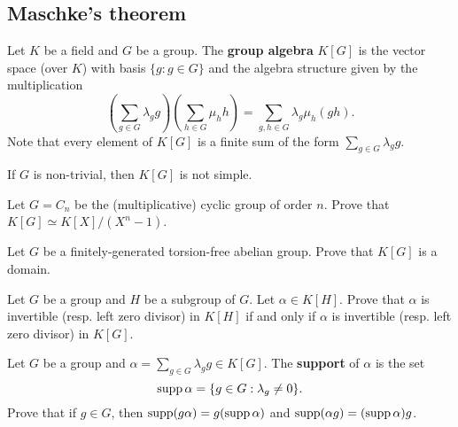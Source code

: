 \chapter{}

\section*{Maschke's theorem}

Let $K$ be a field and $G$ be a group. The \textbf{group algebra} $K[G]$ 
is the vector space (over $K$) with basis $\{g:g\in G\}$ 
and the algebra structure given by the multiplication
\[
	\left(\sum_{g\in G}\lambda_gg\right)\left(\sum_{h\in G}\mu_hh\right)
	=\sum_{g,h\in G}\lambda_g\mu_h(gh).
\]
Note that every element of $K[G]$ is a finite sum of the form $\sum_{g\in G}\lambda_gg$.

\begin{exercise}
\label{xc:K[G]notsimple}
    If $G$ is non-trivial, then $K[G]$ is not simple. 
\end{exercise}

\begin{exercise}
	Let $G=C_n$ be the (multiplicative) cyclic group of order $n$. Prove that 
	$K[G]\simeq K[X]/(X^n-1)$. 
\end{exercise}

\begin{exercise}
	Let $G$ be a finitely-generated torsion-free abelian group. Prove that 
	$K[G]$ is a domain. 
\end{exercise}

\begin{exercise}
	Let $G$ be a group and $H$ be a subgroup of $G$. Let $\alpha\in K[H]$. Prove that 
    $\alpha$ is invertible (resp. left zero divisor) in $K[H]$ if and only if 
	$\alpha$ is invertible (resp. left zero divisor) in
	$K[G]$.
\end{exercise}

\begin{exercise}
	Let $G$ be a group and $\alpha=\sum_{g\in G}\lambda_gg\in K[G]$.  
	The \textbf{support} of $\alpha$ is the set 
	\[
		\operatorname{supp}\alpha=\{g\in G:\lambda_g\ne 0\}.
	\]
	Prove that if $g\in G$, then 
	$\operatorname{supp}(g\alpha)=g(\operatorname{supp}\alpha)$ and $\operatorname{supp}(\alpha g)=(\operatorname{supp}\alpha)g$.
\end{exercise}


